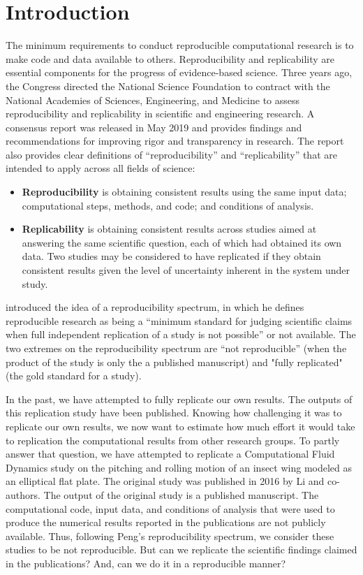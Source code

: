 \section{Introduction}

The minimum requirements to conduct reproducible computational research is to make code and data available to others.
Reproducibility and replicability are essential components for the progress of evidence-based science.
Three years ago, the Congress directed the National Science Foundation to contract with the National Academies of Sciences, Engineering, and Medicine to assess reproducibility and replicability in scientific and engineering research.
A consensus report\supercite{nasem_2019} was released in May 2019 and provides findings and recommendations for improving rigor and transparency in research.
The report also provides clear definitions of ``reproducibility'' and ``replicability'' that are intended to apply across all fields of science:

\begin{itemize}
  \item[] \textbf{Reproducibility} is obtaining consistent results using the same input data; computational steps, methods, and code; and conditions of analysis.
  \item[] \textbf{Replicability} is obtaining consistent results across studies aimed at answering the same scientific question, each of which had obtained its own data. Two studies may be considered to have replicated if they obtain consistent results given the level of uncertainty inherent in the system under study.
\end{itemize}

\citet{peng_2011} introduced the idea of a reproducibility spectrum, in which he defines reproducible research as being a ``minimum standard for judging scientific claims when full independent replication of a study is not possible'' or not available.
The two extremes on the reproducibility spectrum are ``not reproducible'' (when the product of the study is only the a published manuscript) and "fully replicated" (the gold standard for a study).

In the past, we have attempted to fully replicate our own results.\supercite{krishnan_et_al_2014}
The outputs of this replication study have been published.\supercite{mesnard_barba_2017}
Knowing how challenging it was to replicate our own results, we now want to estimate how much effort it would take to replication the computational results from other research groups.
To partly answer that question, we have attempted to replicate a Computational Fluid Dynamics study on the pitching and rolling motion of an insect wing modeled as an elliptical flat plate.
The original study was published in 2016 by Li and co-authors.\supercite{li_dong_2016}
The output of the original study is a published manuscript.
The computational code, input data, and conditions of analysis that were used to produce the numerical results reported in the publications are not publicly available.
Thus, following Peng's reproducibility spectrum, we consider these studies to be not reproducible.
But can we replicate the scientific findings claimed in the publications?
And, can we do it in a reproducible manner?


